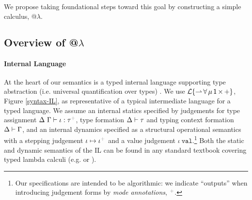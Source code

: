 \begin{contribution}
We propose taking foundational steps toward this goal by  constructing a simple  calculus, @$\lambda$. %
\end{contribution}

\subsection{Overview of @$\lambda$}\label{atlam}\label{overview}

\paragraph{Internal Language} 
At the heart of our semantics is a typed internal language supporting type abstraction (i.e. universal quantification over types) \cite{Reynolds94anintroduction}. We use {$\mathcal{L}\{{\rightharpoonup}\,{\forall}\,{\mu}\,{{\sf 1}}\,{\times}\,{+}\}$}, Figure \ref{syntax-IL}, as representative of a typical intermediate language for a typed language. %
We assume an internal statics specified by judgements for type assignment {$\iDelta~\iGamma \vdash \iota : \tau\moutput$}, type formation {$\Delta \vdash \tau$} and typing context formation { $\Delta \vdash \Gamma$}, and an 
internal dynamics specified as a structural operational semantics with a stepping judgement {\small $\iota \mapsto \iota\moutput$} and a value judgement {$\iota~\mathtt{val}$}.\footnote{Our specifications are intended to be algorithmic: we indicate ``outputs'' when introducing judgement forms by \emph{mode annotations}, $\moutput$.} Both the static and dynamic semantics of the IL can be found in any standard textbook covering typed lambda calculi (e.g. \cite{pfpl} or \cite{tapl}).

